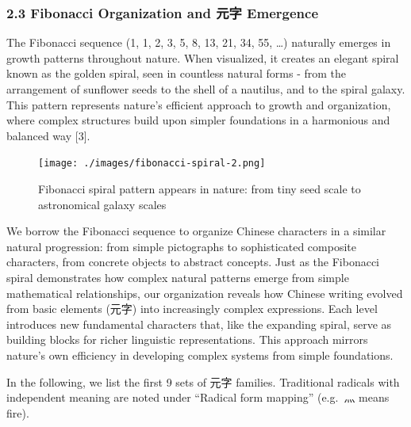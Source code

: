 \documentclass[
  11pt,
  letterpaper,
]{article}
\begin{document}
\subsubsection{2.3 Fibonacci Organization and 元字
Emergence}\label{fibonacci-organization-and-ux5143ux5b57-emergence}

The Fibonacci sequence (1, 1, 2, 3, 5, 8, 13, 21, 34, 55, \ldots)
naturally emerges in growth patterns throughout nature. When visualized,
it creates an elegant spiral known as the golden spiral, seen in
countless natural forms - from the arrangement of sunflower seeds to the
shell of a nautilus, and to the spiral galaxy. This pattern represents
nature's efficient approach to growth and organization, where complex
structures build upon simpler foundations in a harmonious and balanced
way {[}3{]}.

\begin{figure}
\centering
\texttt{[image: ./images/fibonacci-spiral-2.png]}
\caption{Fibonacci spiral pattern appears in nature: from tiny seed scale to astronomical galaxy scales}
\end{figure}

We borrow the Fibonacci sequence to organize Chinese characters in a
similar natural progression: from simple pictographs to sophisticated
composite characters, from concrete objects to abstract concepts. Just
as the Fibonacci spiral demonstrates how complex natural patterns emerge
from simple mathematical relationships, our organization reveals how
Chinese writing evolved from basic elements (元字) into increasingly
complex expressions. Each level introduces new fundamental characters
that, like the expanding spiral, serve as building blocks for richer
linguistic representations. This approach mirrors nature's own
efficiency in developing complex systems from simple foundations.

In the following, we list the first 9 sets of 元字 families. Traditional
radicals with independent meaning are noted under ``Radical form
mapping'' (e.g.~灬 means fire).
\end{document}
